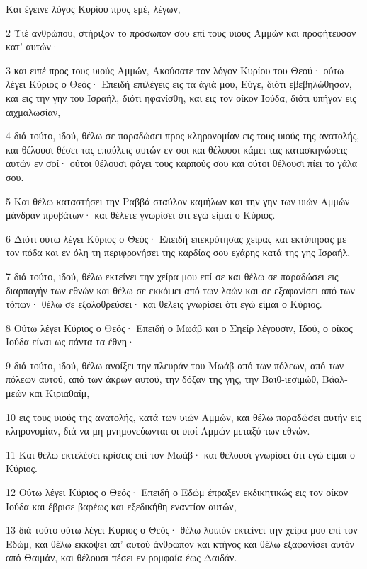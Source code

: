 \par Και έγεινε λόγος Κυρίου προς εμέ, λέγων,
\par 2 Υιέ ανθρώπου, στήριξον το πρόσωπόν σου επί τους υιούς Αμμών και προφήτευσον κατ' αυτών·
\par 3 και ειπέ προς τους υιούς Αμμών, Ακούσατε τον λόγον Κυρίου του Θεού· ούτω λέγει Κύριος ο Θεός· Επειδή επιλέγεις εις τα άγιά μου, Εύγε, διότι εβεβηλώθησαν, και εις την γην του Ισραήλ, διότι ηφανίσθη, και εις τον οίκον Ιούδα, διότι υπήγαν εις αιχμαλωσίαν,
\par 4 διά τούτο, ιδού, θέλω σε παραδώσει προς κληρονομίαν εις τους υιούς της ανατολής, και θέλουσι θέσει τας επαύλεις αυτών εν σοι και θέλουσι κάμει τας κατασκηνώσεις αυτών εν σοί· ούτοι θέλουσι φάγει τους καρπούς σου και ούτοι θέλουσι πίει το γάλα σου.
\par 5 Και θέλω καταστήσει την Ραββά σταύλον καμήλων και την γην των υιών Αμμών μάνδραν προβάτων· και θέλετε γνωρίσει ότι εγώ είμαι ο Κύριος.
\par 6 Διότι ούτω λέγει Κύριος ο Θεός· Επειδή επεκρότησας χείρας και εκτύπησας με τον πόδα και εν όλη τη περιφρονήσει της καρδίας σου εχάρης κατά της γης Ισραήλ,
\par 7 διά τούτο, ιδού, θέλω εκτείνει την χείρα μου επί σε και θέλω σε παραδώσει εις διαρπαγήν των εθνών και θέλω σε εκκόψει από των λαών και σε εξαφανίσει από των τόπων· θέλω σε εξολοθρεύσει· και θέλεις γνωρίσει ότι εγώ είμαι ο Κύριος.
\par 8 Ούτω λέγει Κύριος ο Θεός· Επειδή ο Μωάβ και ο Σηείρ λέγουσιν, Ιδού, ο οίκος Ιούδα είναι ως πάντα τα έθνη·
\par 9 διά τούτο, ιδού, θέλω ανοίξει την πλευράν του Μωάβ από των πόλεων, από των πόλεων αυτού, από των άκρων αυτού, την δόξαν της γης, την Βαιθ-ιεσιμώθ, Βάαλ-μεών και Κιριαθαΐμ,
\par 10 εις τους υιούς της ανατολής, κατά των υιών Αμμών, και θέλω παραδώσει αυτήν εις κληρονομίαν, διά να μη μνημονεύωνται οι υιοί Αμμών μεταξύ των εθνών.
\par 11 Και θέλω εκτελέσει κρίσεις επί τον Μωάβ· και θέλουσι γνωρίσει ότι εγώ είμαι ο Κύριος.
\par 12 Ούτω λέγει Κύριος ο Θεός· Επειδή ο Εδώμ έπραξεν εκδικητικώς εις τον οίκον Ιούδα και έβρισε βαρέως και εξεδικήθη εναντίον αυτών,
\par 13 διά τούτο ούτω λέγει Κύριος ο Θεός· θέλω λοιπόν εκτείνει την χείρα μου επί τον Εδώμ, και θέλω εκκόψει απ' αυτού άνθρωπον και κτήνος και θέλω εξαφανίσει αυτόν από Θαιμάν, και θέλουσι πέσει εν ρομφαία έως Δαιδάν.
